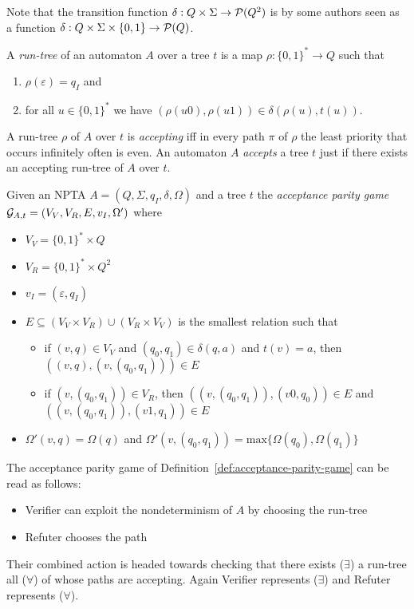 \documentclass[runningheads,a4paper]{llncs}
\begin{document}
\begin{remark}
Note that the transition function $\delta: Q \times \Sigma \to \mathcal{P}(Q^2)$ is by some authors seen as a function
 $\delta: Q \times \Sigma \times \{0,1\} \to \mathcal{P}(Q)$.
\end{remark}

A \emph{run-tree} of an automaton $A$ over a tree $t$ is a map $\rho: \{0,1\}^* \to Q$ such that 
\begin{enumerate}
\item $\rho(\varepsilon) = q_I$ and
\item for all $u \in \{0,1\}^*$ we have $(\rho(u0), \rho(u1)) \in \delta(\rho(u), t(u))$.
\end{enumerate}

A run-tree $\rho$ of $A$ over $t$ is \emph{accepting} iff in every path $\pi$ of $\rho$ the least priority that occurs infinitely often is even. An automaton $A$ \emph{accepts} a tree $t$ just if there exists an accepting run-tree of $A$ over $t$.

\begin{definition}\label{def:acceptance-parity-game}
Given an NPTA $A = (Q, \Sigma, q_I, \delta, \Omega)$ and a tree $t$ the \emph{acceptance parity game} 
 $\mathcal{G}_{A,t} = (V_V, V_R, E, v_I, \Omega')$ where 
\begin{itemize}
\item $V_V = \{0,1\}^* \times Q$
\item $V_R = \{0,1\}^* \times Q^2$
\item $v_I = (\varepsilon, q_I)$
\item $E \subseteq (V_V \times V_R) \cup (V_R \times V_V)$ is the smallest relation such that
\begin{itemize}
\item if $(v,q) \in V_V$ and $(q_0, q_1) \in \delta(q, a)$ and $t(v) = a$, then \mbox{$((v,q), (v,(q_0,q_1))) \in E$}
\item if $(v,(q_0,q_1)) \in V_R$, then $((v,(q_0,q_1)), (v0, q_0) ) \in E$ and \mbox{$((v,(q_0,q_1)), (v1, q_1) ) \in E$}
\end{itemize}
\item $\Omega'(v,q) = \Omega(q)$ and $\Omega'(v,(q_0,q_1)) = \mathrm{max}\{\Omega(q_0),\Omega(q_1)\}$
\end{itemize}
\end{definition}

The acceptance parity game of Definition~\ref{def:acceptance-parity-game} can be read as follows:
\begin{itemize}
\item Verifier can exploit the nondeterminism of $A$ by choosing the run-tree
\item Refuter chooses the path
\end{itemize}
Their combined action is headed towards checking that there exists ($\exists$) a run-tree all ($\forall$) of whose paths are accepting. Again Verifier represents ($\exists$) and Refuter represents ($\forall$).
\end{document}
